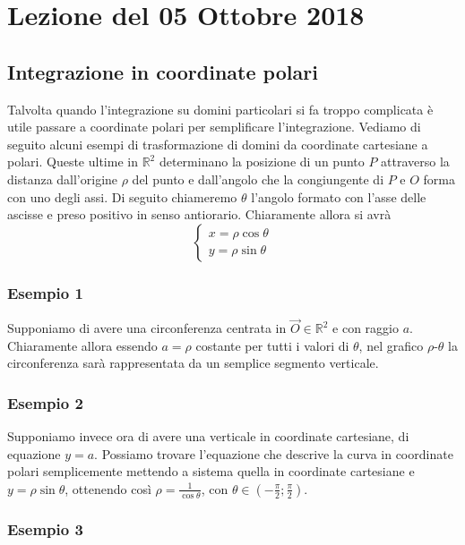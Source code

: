 \documentclass[10pt]{article}
\theoremstyle{plain}
\theoremstyle{definition}
\begin{document}
\section{Lezione del 05 Ottobre 2018}

\subsection{Integrazione in coordinate polari}

Talvolta quando l'integrazione su domini particolari si fa troppo complicata è utile passare a coordinate polari per semplificare l'integrazione. Vediamo di seguito alcuni esempi di trasformazione di domini da coordinate cartesiane a polari. Queste ultime in $\mathbb{R}^2$ determinano la posizione di un punto $P$ attraverso la distanza dall'origine $\rho$ del punto e dall'angolo che la congiungente di $P$ e $O$ forma con uno degli assi. Di seguito chiameremo $\theta$ l'angolo formato con l'asse delle ascisse e preso positivo in senso antiorario. Chiaramente allora si avrà
\begin{equation}
\begin{cases}
x=\rho \cos{\theta}\\
y=\rho \sin{\theta}
\end{cases}     
\label{eq: polari}
\end{equation}
 
\subsubsection{Esempio 1}

Supponiamo di avere una circonferenza centrata in $\vec{O} \in \mathbb{R}^2$ e con raggio $a$. Chiaramente allora essendo $a=\rho$ costante per tutti i valori di $\theta$, nel grafico $\rho$-$\theta$ la circonferenza sarà rappresentata da un semplice segmento verticale.

\subsubsection{Esempio 2}

Supponiamo invece ora di avere una verticale in coordinate cartesiane, di equazione $y=a$. Possiamo trovare l'equazione che descrive la curva in coordinate polari semplicemente mettendo a sistema quella in coordinate cartesiane e $y=\rho \sin{\theta}$, ottenendo così $\rho=\frac{1}{\cos{\theta}}$, con $\theta \in (-\frac{\pi}{2}; \frac{\pi}{2})$. 

\subsubsection{Esempio 3}
\end{document}
